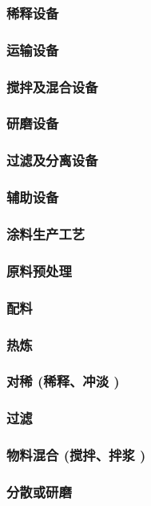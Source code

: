\documentclass[UTF8]{../../ApplicationUniverse}
\begin{document}
        \subsubsection{稀释设备}
        \subsubsection{运输设备}
        \subsubsection{搅拌及混合设备}
        \subsubsection{研磨设备}
        \subsubsection{过滤及分离设备}
        \subsubsection{辅助设备}
    \subsubsection{涂料生产工艺}
        \subsubsection{原料预处理}
        \subsubsection{配料}
        \subsubsection{热炼}
        \subsubsection{对稀 (稀释、冲淡 )}
        \subsubsection{过滤}
        \subsubsection{物料混合 (搅拌、拌浆 )}
        \subsubsection{分散或研磨}
\end{document}
